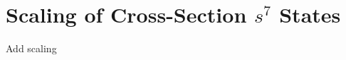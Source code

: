 \section{\label{sec:intro.Scaling}Scaling of Cross-Section \texorpdfstring{$s^7$}{s7} States}

Add scaling 